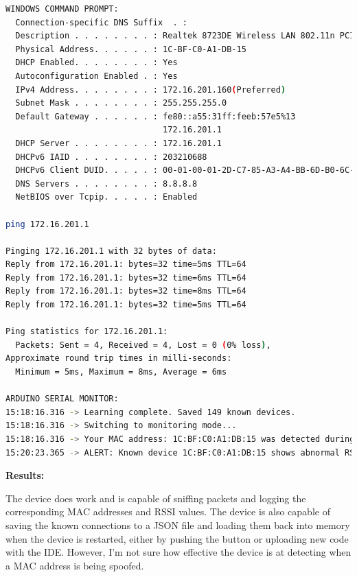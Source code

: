 \documentclass[letterpaper, 11pt]{article}
\newcommand{\secHeader}[1]{\vspace{2mm} \noindent \textbf{#1:}\vspace{-4mm}}
\begin{document}
\begin{lstlisting}[language=bash, caption=Testing Known Devices for Abnormal RSSI Values, label=lst:testing]
WINDOWS COMMAND PROMPT:
  Connection-specific DNS Suffix  . :
  Description . . . . . . . . : Realtek 8723DE Wireless LAN 802.11n PCI-E NIC
  Physical Address. . . . . . : 1C-BF-C0-A1-DB-15
  DHCP Enabled. . . . . . . . : Yes
  Autoconfiguration Enabled . : Yes
  IPv4 Address. . . . . . . . : 172.16.201.160(Preferred)
  Subnet Mask . . . . . . . . : 255.255.255.0
  Default Gateway . . . . . . : fe80::a55:31ff:feeb:57e5%13
                                172.16.201.1
  DHCP Server . . . . . . . . : 172.16.201.1
  DHCPv6 IAID . . . . . . . . : 203210688
  DHCPv6 Client DUID. . . . . : 00-01-00-01-2D-C7-85-A3-A4-BB-6D-B0-6C-C8
  DNS Servers . . . . . . . . : 8.8.8.8
  NetBIOS over Tcpip. . . . . : Enabled

ping 172.16.201.1

Pinging 172.16.201.1 with 32 bytes of data:
Reply from 172.16.201.1: bytes=32 time=5ms TTL=64
Reply from 172.16.201.1: bytes=32 time=6ms TTL=64
Reply from 172.16.201.1: bytes=32 time=8ms TTL=64
Reply from 172.16.201.1: bytes=32 time=5ms TTL=64

Ping statistics for 172.16.201.1:
  Packets: Sent = 4, Received = 4, Lost = 0 (0% loss),
Approximate round trip times in milli-seconds:
  Minimum = 5ms, Maximum = 8ms, Average = 6ms

ARDUINO SERIAL MONITOR:
15:18:16.316 -> Learning complete. Saved 149 known devices.
15:18:16.316 -> Switching to monitoring mode...
15:18:16.316 -> Your MAC address: 1C:BF:C0:A1:DB:15 was detected during learning mode. RSSI: -29 dBm
15:20:23.365 -> ALERT: Known device 1C:BF:C0:A1:DB:15 shows abnormal RSSI change! Current RSSI: -55 dBm, Known Avg RSSI: -29 dBm
\end{lstlisting}

\secHeader{Results}
\vspace{5mm}

The device does work and is capable of sniffing packets and logging the corresponding MAC addresses and RSSI values. The device is also capable of saving the known connections to a JSON file
and loading them back into memory when the device is restarted, either by pushing the button or uploading new code with the IDE. However, I'm not sure how effective the device is at detecting when a 
MAC address is being spoofed. 
\end{document}
